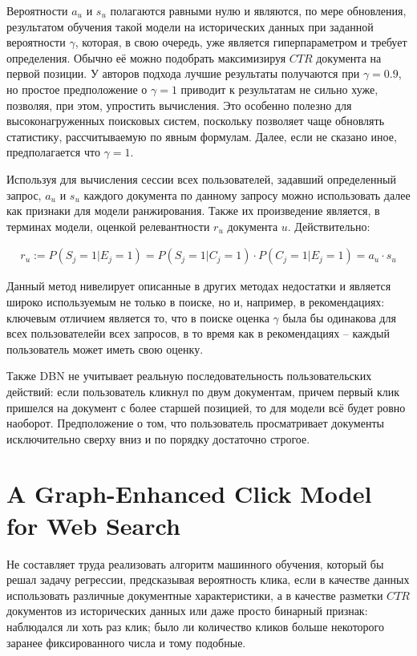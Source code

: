 \documentclass[diploma]{nanolab2015}
\begin{document}
Вероятности $a_u$ и $s_u$ полагаются равными нулю и являются, по мере обновления, результатом обучения такой модели на исторических данных при заданной вероятности $\gamma$, которая, в свою очередь, уже является гиперпараметром и требует определения. Обычно её можно подобрать максимизируя $CTR$ документа на первой позиции. У авторов подхода лучшие результаты получаются при $\gamma = 0.9$, но простое предположение о $\gamma = 1$ приводит к результатам не сильно хуже, позволяя, при этом, упростить вычисления. Это особенно полезно для высоконагруженных поисковых систем, поскольку позволяет чаще обновлять статистику, рассчитываемую по явным формулам. Далее, если не сказано иное, предполагается что $\gamma = 1$. 

Используя для вычисления сессии всех пользователей, задавший определенный запрос, $a_u$ и $s_u$ каждого документа по данному запросу можно использовать далее как признаки для модели ранжирования. Также их произведение является, в терминах модели, оценкой релевантности $r_u$ документа $u$. Действительно:

\begin{align}
    r_u := P(S_j=1 | E_j = 1) = P(S_j = 1 | C_j = 1) \cdot P(C_j = 1 | E_j = 1) = a_u \cdot s_u
\end{align}

Данный метод нивелирует описанные в других методах недостатки и является широко используемым не только в поиске, но и, например, в рекомендациях: ключевым отличием является то, что в поиске оценка $\gamma$ была бы одинакова для всех пользователейи всех запросов, в то время как в рекомендациях -- каждый пользователь может иметь свою оценку.

Также DBN не учитывает реальную последовательность пользовательских действий: если пользователь кликнул по двум документам, причем первый клик пришелся на документ с более старшей позицией, то для модели всё будет ровно наоборот. Предположение о том, что пользователь просматривает документы исключительно сверху вниз и по порядку достаточно строгое.

\section{A Graph-Enhanced Click Model for Web Search}
Не составляет труда реализовать алгоритм машинного обучения, который бы решал задачу регрессии, предсказывая вероятность клика, если в качестве данных использовать различные документные характеристики, а в качестве разметки $CTR$ документов из исторических данных или даже просто бинарный признак: наблюдался ли хоть раз клик; было ли количество кликов больше некоторого заранее фиксированного числа и тому подобные.
\end{document}
